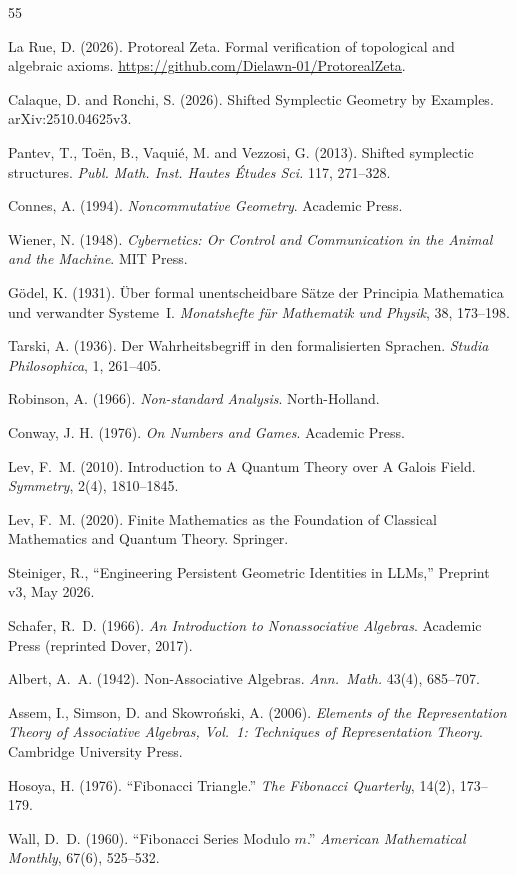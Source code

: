 \begin{thebibliography}{55}

 La Rue, D. (2026). Protoreal Zeta. Formal verification of topological and algebraic axioms. \url{https://github.com/Dielawn-01/ProtorealZeta}.

 Calaque, D. and Ronchi, S. (2026). Shifted Symplectic Geometry by Examples. arXiv:2510.04625v3.

 Pantev, T., To\"en, B., Vaqui\'e, M. and Vezzosi, G. (2013). Shifted symplectic structures. \emph{Publ. Math. Inst. Hautes \'Etudes Sci.} 117, 271--328.

 Connes, A. (1994). \emph{Noncommutative Geometry}. Academic Press.

 Wiener, N. (1948). \emph{Cybernetics: Or Control and Communication in the Animal and the Machine}. MIT Press.

 G\"odel, K. (1931). \"Uber formal unentscheidbare S\"atze der Principia Mathematica und verwandter Systeme~I. \emph{Monatshefte f\"ur Mathematik und Physik}, 38, 173--198.

 Tarski, A. (1936). Der Wahrheitsbegriff in den formalisierten Sprachen. \emph{Studia Philosophica}, 1, 261--405.

 Robinson, A. (1966). \emph{Non-standard Analysis}. North-Holland.

 Conway, J. H. (1976). \emph{On Numbers and Games}. Academic Press.

Lev, F.~M. (2010).
Introduction to A Quantum Theory over A Galois Field.
\emph{Symmetry}, 2(4), 1810--1845.

Lev, F.~M. (2020).
Finite Mathematics as the Foundation of Classical Mathematics and Quantum Theory.
Springer.

Steiniger, R.,
``Engineering Persistent Geometric Identities in LLMs,''
Preprint v3, May 2026.

Schafer, R.~D. (1966).
\emph{An Introduction to Nonassociative Algebras}.
Academic Press (reprinted Dover, 2017).

Albert, A.~A. (1942).
Non-Associative Algebras.
\emph{Ann.\ Math.} 43(4), 685--707.

Assem, I., Simson, D. and Skowro\'nski, A. (2006).
\emph{Elements of the Representation Theory of Associative Algebras, Vol.~1: Techniques of Representation Theory}.
Cambridge University Press.

Hosoya, H. (1976).
``Fibonacci Triangle.''
\textit{The Fibonacci Quarterly}, 14(2), 173--179.

Wall, D.~D. (1960).
``Fibonacci Series Modulo $m$.''
\textit{American Mathematical Monthly}, 67(6), 525--532.

\end{thebibliography}
